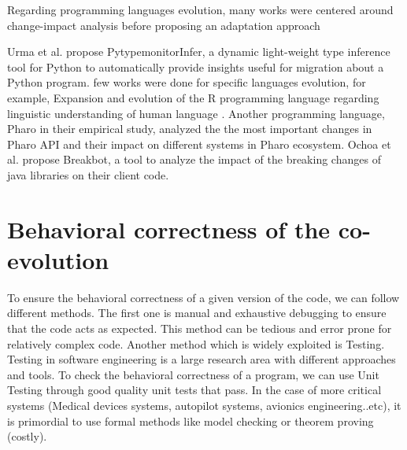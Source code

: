 Regarding programming languages evolution, many works were centered around change-impact analysis before proposing an adaptation approach \cite{arnold1996software,ren2004chianti,ryder2001change}


 
 Urma et al.\cite{urma2017programming} propose PytypemonitorInfer, a dynamic light-weight type inference tool for Python to automatically provide insights useful for migration about a Python program.
 few works were done for specific languages evolution, for example, Expansion and evolution of the R programming language regarding linguistic understanding of human language \cite{urma2017programming}.
Another programming language, Pharo \cite{7332471} in their empirical study, analyzed the the most important changes in Pharo API and their impact on different systems in Pharo ecosystem.
Ochoa et al. \cite{10.1145/3510455.3512783} propose Breakbot, a tool to analyze the impact of  the breaking changes of java libraries on their client code.
	
 \section{Behavioral correctness of the co-evolution}
 \label{behavioralcorrectness}
 
 
 
 
 
 

 To ensure the behavioral correctness of a given version of the code, we can follow different methods. The first one is manual and exhaustive debugging to ensure that the code acts as expected. This method can be tedious and error prone for relatively complex code. Another method which is widely exploited is Testing. Testing in software engineering is a large research area with different approaches and tools. To check the behavioral correctness of a program, we can use Unit Testing through good quality unit tests that pass. In the case of more critical systems (Medical devices systems, autopilot systems, avionics engineering..etc), it is primordial to use formal methods like model checking or theorem proving \cite{ZHANG201312} (costly).
 

